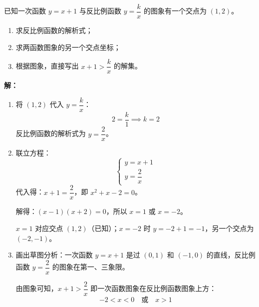 \documentclass[12pt, a4paper]{ctexart}
\begin{document}
\begin{examplebox}[【例6】反比例函数与一次函数的交点]
已知一次函数 $y = x + 1$ 与反比例函数 $y = \dfrac{k}{x}$ 的图象有一个交点为 $(1, 2)$。
\begin{enumerate}[label=(\arabic*)]
  \item 求反比例函数的解析式；
  \item 求两函数图象的另一个交点坐标；
  \item 根据图象，直接写出 $x + 1 > \dfrac{k}{x}$ 的解集。
\end{enumerate}
\end{examplebox}

\textbf{解：}
\begin{enumerate}[label=(\arabic*)]
  \item 将 $(1, 2)$ 代入 $y = \dfrac{k}{x}$：
  \[
    2 = \frac{k}{1} \implies k = 2
  \]
  反比例函数的解析式为 $y = \dfrac{2}{x}$。

  \item 联立方程：
  \[
    \begin{cases}
      y = x + 1 \\[4pt]
      y = \dfrac{2}{x}
    \end{cases}
  \]
  代入得：$x + 1 = \dfrac{2}{x}$，即 $x^2 + x - 2 = 0$。

  解得：$(x - 1)(x + 2) = 0$，所以 $x = 1$ 或 $x = -2$。

  $x = 1$ 对应交点 $(1, 2)$（已知）；$x = -2$ 时 $y = -2 + 1 = -1$，另一个交点为 $(-2, -1)$。

  \item 画出草图分析：一次函数 $y = x + 1$ 是过 $(0,1)$ 和 $(-1,0)$ 的直线，反比例函数 $y = \dfrac{2}{x}$ 的图象在第一、三象限。
  \begin{center}
  \end{center}

  由图象可知，$x + 1 > \dfrac{2}{x}$ 即一次函数图象在反比例函数图象上方：
  \[
    -2 < x < 0 \quad \text{或} \quad x > 1
  \]
\end{enumerate}
\end{document}
